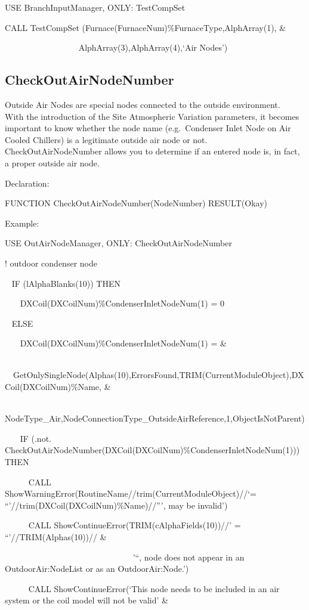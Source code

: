 USE BranchInputManager, ONLY: TestCompSet

CALL TestCompSet (Furnace(FurnaceNum)\%FurnaceType,AlphArray(1), \&

~~~~~~~~~~~~~~~~~ AlphArray(3),AlphArray(4),`Air Nodes')

\subsection{CheckOutAirNodeNumber}\label{checkoutairnodenumber}

Outside Air Nodes are special nodes connected to the outside environment.~ With the introduction of the Site Atmospheric Variation parameters, it becomes important to know whether the node name (e.g.~Condenser Inlet Node on Air Cooled Chillers) is a legitimate outside air node or not.~ CheckOutAirNodeNumber allows you to determine if an entered node is, in fact, a proper outside air node.

Declaration:

FUNCTION CheckOutAirNodeNumber(NodeNumber) RESULT(Okay)

Example:

USE OutAirNodeManager, ONLY: CheckOutAirNodeNumber

! outdoor condenser node

~ IF (lAlphaBlanks(10)) THEN

~~~ DXCoil(DXCoilNum)\%CondenserInletNodeNum(1) = 0

~ ELSE

~~~ DXCoil(DXCoilNum)\%CondenserInletNodeNum(1) = \&

~~~~ ~~GetOnlySingleNode(Alphas(10),ErrorsFound,TRIM(CurrentModuleObject),DXCoil(DXCoilNum)\%Name, \&

~~~~~~~~~~~~~~~~~~~~~~~~ NodeType\_Air,NodeConnectionType\_OutsideAirReference,1,ObjectIsNotParent)

~~~ IF (.not. CheckOutAirNodeNumber(DXCoil(DXCoilNum)\%CondenserInletNodeNum(1))) THEN

~~~~~ CALL ShowWarningError(RoutineName//trim(CurrentModuleObject)//`= ``'//trim(DXCoil(DXCoilNum)\%Name)//''', may be invalid')

~~~~~ CALL ShowContinueError(TRIM(cAlphaFields(10))//' = ``'//TRIM(Alphas(10))// \&

~~~~~~~~~~~~~~~~~~~~~~~~~~ ~~~~'``, node does not appear in an OutdoorAir:NodeList or as an OutdoorAir:Node.')

~~~~~ CALL ShowContinueError(`This node needs to be included in an air system or the coil model will not be valid' \&

